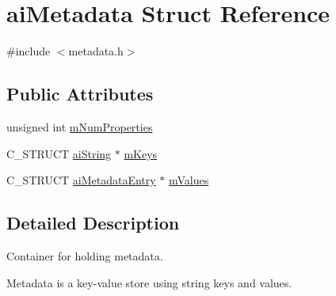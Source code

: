 \hypertarget{structai_metadata}{\section{ai\-Metadata Struct Reference}
\label{structai_metadata}
}


{\ttfamily \#include $<$metadata.\-h$>$}

\subsection*{Public Attributes}
\begin{DoxyCompactItemize}
\item 
unsigned int \hyperlink{structai_metadata_a32c4587c53dd402a5878ffc94088e528}{m\-Num\-Properties}
\item 
C\-\_\-\-S\-T\-R\-U\-C\-T \hyperlink{structai_string}{ai\-String} $\ast$ \hyperlink{structai_metadata_aa8c77a263443658737ee51a74e3c292e}{m\-Keys}
\item 
C\-\_\-\-S\-T\-R\-U\-C\-T \hyperlink{structai_metadata_entry}{ai\-Metadata\-Entry} $\ast$ \hyperlink{structai_metadata_a34b515fcb5b806c471d3c6ce7bc76beb}{m\-Values}
\end{DoxyCompactItemize}


\subsection{Detailed Description}
Container for holding metadata.

Metadata is a key-\/value store using string keys and values. 

